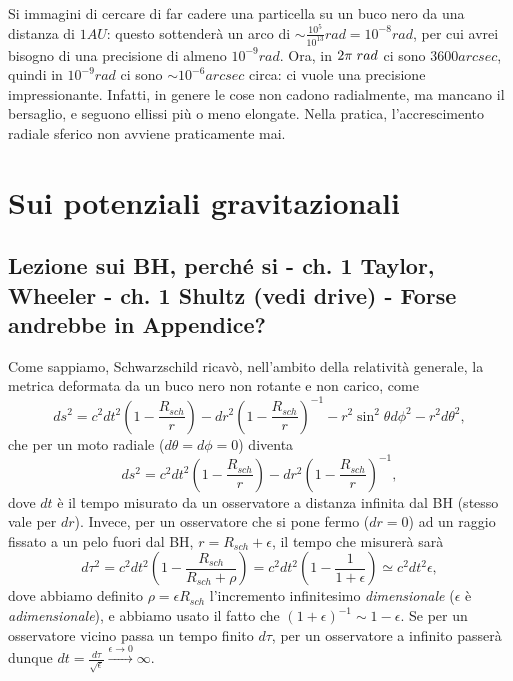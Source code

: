 Si immagini di cercare di far cadere una particella su un buco nero da una distanza di $1AU$: questo sottenderà un arco di $\sim \frac{10^5}{10^{13}} rad= 10^{-8} rad$, per cui avrei bisogno di una precisione di almeno $10^{-9}rad$.
Ora, in $2\pi \hspace{1mm}rad$ ci sono $3600arcsec$, quindi in $10^{-9}rad $ ci sono $\sim 10^{-6}arcsec$ circa: ci vuole una precisione impressionante.
Infatti, in genere le cose non cadono radialmente, ma mancano il bersaglio, e seguono ellissi più o meno elongate. Nella pratica, l'accrescimento radiale sferico non avviene praticamente mai.




\section{Sui potenziali gravitazionali}

\subsection{Lezione sui BH, perché si - ch. 1 Taylor, Wheeler - ch. 1 Shultz (vedi drive) - Forse andrebbe in Appendice?}
Come sappiamo, Schwarzschild ricavò, nell'ambito della relatività generale, la metrica deformata da un buco nero non rotante e non carico, come
\begin{equation}
    ds^2 = c^2dt^2\left( 1-\frac{R_{sch}}{r} \right) - dr^2 \left( 1-\frac{R_{sch}}{r} \right)^{-1}-r^2\sin^2{\theta}d\phi^2-r^2d\theta^2,
\end{equation}
che per un moto radiale ($d\theta=d\phi=0 $) diventa
\begin{equation}
    ds^2 = c^2dt^2\left( 1-\frac{R_{sch}}{r} \right) - dr^2 \left( 1-\frac{R_{sch}}{r} \right)^{-1},
\end{equation}
dove $dt$ è il tempo misurato da un osservatore a distanza infinita dal BH (stesso vale per $dr$).
Invece, per un osservatore che si pone fermo ($dr=0 $) ad un raggio fissato a un pelo fuori dal BH, $r=R_{sch}+\epsilon $, il tempo che misurerà sarà 
\begin{equation}
    d\tau^2 = c^2dt^2\left( 1-\frac{R_{sch}}{R_{sch}+\rho} \right) = c^2dt^2\left( 1-\frac{1}{1+\epsilon} \right) \simeq c^2dt^2\epsilon,
\end{equation}
dove abbiamo definito $\rho = \epsilon R_{sch} $ l'incremento infinitesimo \textit{dimensionale} ($\epsilon $ è \textit{adimensionale}), e abbiamo usato il fatto che $(1+\epsilon)^{-1} \sim 1-\epsilon $.
Se per un osservatore vicino passa un tempo finito $d\tau$, per un osservatore a infinito passerà dunque $dt=\frac{d\tau}{\sqrt{\epsilon}}\xrightarrow{\epsilon\xrightarrow{}0}\infty $.
